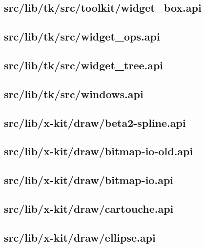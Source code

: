 \subsection{src/lib/tk/src/toolkit/widget\_box.api}


\subsection{src/lib/tk/src/widget\_ops.api}


\subsection{src/lib/tk/src/widget\_tree.api}


\subsection{src/lib/tk/src/windows.api}


\subsection{src/lib/x-kit/draw/beta2-spline.api}


\subsection{src/lib/x-kit/draw/bitmap-io-old.api}


\subsection{src/lib/x-kit/draw/bitmap-io.api}


\subsection{src/lib/x-kit/draw/cartouche.api}


\subsection{src/lib/x-kit/draw/ellipse.api}


